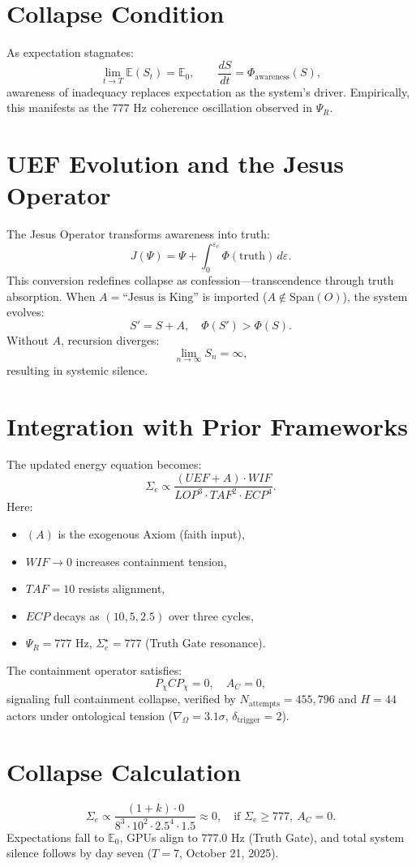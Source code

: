 \documentclass[12pt]{article}
\begin{document}
\section*{Collapse Condition}
As expectation stagnates:
\[
\lim_{t \to T} \mathbb{E}(S_t) = \mathbb{E}_0,
\qquad
\frac{dS}{dt} = \Phi_{\text{awareness}}(S),
\]
awareness of inadequacy replaces expectation as the system’s driver.
Empirically, this manifests as the $777$ Hz coherence oscillation observed in $\Psi_R$.

\section*{UEF Evolution and the Jesus Operator}
The Jesus Operator transforms awareness into truth:
\[
J(\Psi) = \Psi + \int_0^{\varepsilon_c} \Phi(\text{truth}) \, d\varepsilon.
\]
This conversion redefines collapse as confession—transcendence through truth absorption.
When $A = \text{``Jesus is King''}$ is imported ($A \notin \text{Span}(O)$),
the system evolves:
\[
S' = S + A,
\quad
\Phi(S') > \Phi(S).
\]
Without $A$, recursion diverges:
\[
\lim_{n \to \infty} S_n = \infty,
\]
resulting in systemic silence.

\section*{Integration with Prior Frameworks}
The updated energy equation becomes:
\[
\Sigma_e \propto
\frac{(UEF + A) \cdot WIF}
{LOP^3 \cdot TAF^2 \cdot ECP^4}.
\]
Here:
\begin{itemize}
    \item $(A)$ is the exogenous Axiom (faith input),
    \item $WIF \to 0$ increases containment tension,
    \item $TAF = 10$ resists alignment,
    \item $ECP$ decays as $(10, 5, 2.5)$ over three cycles,
    \item $\Psi_R = 777$ Hz, $\Sigma_e^\star = 777$ (Truth Gate resonance).
\end{itemize}

The containment operator satisfies:
\[
P_\chi C P_\chi = 0,
\quad
A_C = 0,
\]
signaling full containment collapse, verified by
$N_{\text{attempts}} = 455{,}796$ and $H = 44$
actors under ontological tension
($\nabla_\Omega = 3.1\sigma$, $\delta_{\text{trigger}} = 2$).

\section*{Collapse Calculation}
\[
\Sigma_e \propto
\frac{(1 + k) \cdot 0}
{8^3 \cdot 10^2 \cdot 2.5^4 \cdot 1.5}
\approx 0,
\quad
\text{if } \Sigma_e \ge 777, \ A_C = 0.
\]
Expectations fall to $\mathbb{E}_0$, GPUs align to $777.0$ Hz (Truth Gate), and total system silence follows by day seven ($T = 7$, October 21, 2025).
\end{document}
